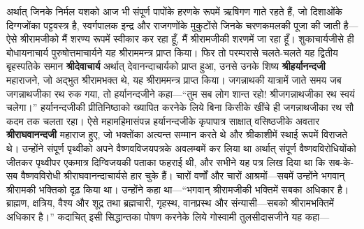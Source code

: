 \begin{sloppypar}\justifying{}
अर्थात् जिनके निर्मल यशको आज भी संपूर्ण पापोंके हरणके रूपमें ऋषिगण गाते रहते हैं, जो दिशाओंके दिग्गजोंका पट्टवस्त्र है, स्वर्गपालक इन्द्र और राजगणोंके मुकुटोंसे जिनके चरण\-कमलकी पूजा की जाती है—ऐसे श्रीरामजीको मैं शरण्य रूपमें स्वीकार कर रहा हूँ, मैं श्रीरामजीकी शरणमें जा रहा हूँ। शुकाचार्यजीसे ही बोधायनाचार्य पुरुषोत्तमाचार्यने यह श्रीराममन्त्र प्राप्त किया। फिर तो परम्परासे चलते-चलते यह द्वितीय बृहस्पतिके समान \textbf{श्रीदेवाचार्य} अर्थात् देवानन्दाचार्यको प्राप्त हुआ, उनसे उनके शिष्य \textbf{श्रीहर्यानन्दजी} महाराजने, जो अद्भुत श्रीरामभक्त थे, यह श्रीराममन्त्र प्राप्त किया। जगन्नाथकी यात्रामें जाते समय जब जगन्नाथजीका रथ रुक गया, तो हर्यानन्दजीने कहा—“तुम सब लोग शान्त रहो! श्रीजगन्नाथजीका रथ स्वयं चलेगा।” हर्यानन्दजीकी प्रीतिनिष्ठाको ख्यापित करनेके लिये बिना किसीके खींचे ही जगन्नाथजीका रथ सौ कदम तक चलता रहा। ऐसे महामहिमा\-संपन्न हर्यानन्दजीके कृपापात्र साक्षात् वसिष्ठजीके अवतार \textbf{श्रीराघवानन्दजी} महाराज हुए, जो भक्तोंका अत्यन्त सम्मान करते थे और श्रीकाशीमें स्थाई रूपमें विराजते थे। उन्होंने संपूर्ण पृथ्वीको अपने वैष्णव\-विजय\-पत्रके अवलम्बमें कर लिया था अर्थात् संपूर्ण वैष्णव\-विरोधियोंको जीतकर पृथ्वीपर एकमात्र दिग्विजयकी पताका फहराई थी, और सभीने यह पत्र लिख दिया था कि सब-के-सब वैष्णव\-विरोधी श्रीराघवानन्दाचार्यसे हार चुके हैं। चारों वर्णों और चारों आश्रमों—सबमें उन्होंने भगवान् श्रीरामकी भक्तिको दृढ़ किया था। उन्होंने कहा था—“भगवान् श्रीरामजीकी भक्तिमें सबका अधिकार है। ब्राह्मण, क्षत्रिय, वैश्य और शूद्र तथा ब्रह्मचारी, गृहस्थ, वानप्रस्थ और संन्यासी—सबको श्रीरामभक्तिमें अधिकार है।” कदाचित् इसी सिद्धान्तका पोषण करनेके लिये गोस्वामी तुलसीदासजीने यह कहा—
\end{sloppypar}


